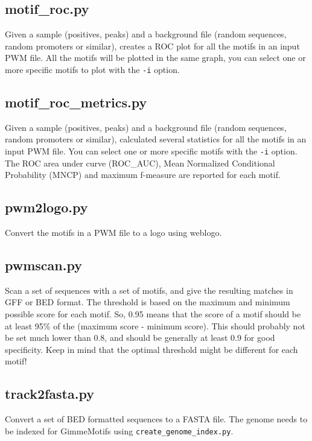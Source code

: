 \documentclass[11pt]{article}
\begin{document}
\subsection*{motif\_roc.py}
Given a sample (positives, peaks) and a background file (random sequences, random promoters or similar),  creates a ROC plot for all the motifs in an input PWM file. All the motifs will be plotted in the same graph, you can select one or more specific motifs to plot with the \texttt{-i} option.

\subsection*{motif\_roc\_metrics.py}
Given a sample (positives, peaks) and a background file (random sequences, random promoters or similar),  calculated several statistics for all the motifs in an input PWM file. You can select one or more specific motifs with the \texttt{-i} option. The ROC area under curve (ROC\_AUC), Mean Normalized Conditional Probability (MNCP) and maximum f-measure are reported for each motif.

\subsection*{pwm2logo.py}
Convert the motifs in a PWM file to a logo using weblogo.

\subsection*{pwmscan.py}
Scan a set of sequences with a set of motifs, and give the resulting matches in GFF or BED format. The threshold is based on the maximum and minimum possible score for each motif. So, 0.95 means that the score of a motif should be at least 95\% of the (maximum score - minimum score). This should probably not be set much lower than 0.8, and should be generally at least 0.9 for good specificity. Keep in mind that the optimal threshold might be different for each motif!

\subsection*{track2fasta.py }
Convert a set of BED formatted sequences to a FASTA file. The genome needs to be indexed for GimmeMotifs using \texttt{create\_genome\_index.py}.

\end{document}
